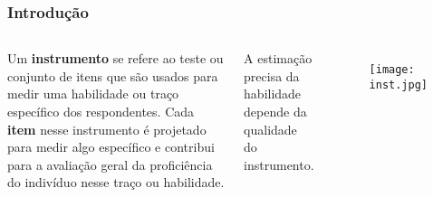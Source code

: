 \documentclass{beamer}
\begin{document}
\begin{frame}
	
	\frametitle{Introdução}
	\begin{columns}
		
		
		Um \textbf{instrumento} se refere ao teste ou conjunto de itens que são usados para medir uma habilidade ou traço específico dos respondentes. Cada \textbf{item} nesse instrumento é projetado para medir algo específico e contribui para a avaliação geral da proficiência do indivíduo nesse traço ou habilidade. \newline
		
		A estimação precisa da habilidade depende da qualidade do instrumento.
		
		
		\begin{figure}
			\texttt{[image: inst.jpg]}
		\end{figure}	
		
	\end{columns}
	
\end{frame}
\end{document}

